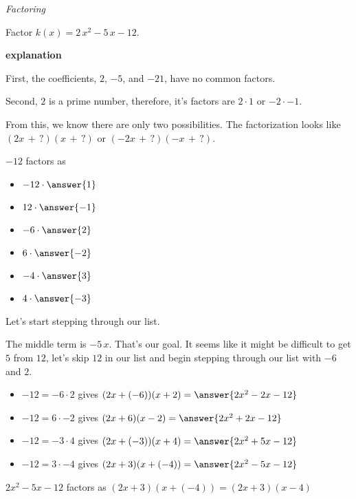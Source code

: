 \documentclass{ximera}
\begin{document}
\begin{example} \textit{Factoring}

Factor $k(x) = 2 \, x^2 - 5 \, x - 12$.


\textbf{explanation}


First, the coefficients, $2$, $-5$, and $-21$, have no common factors.


Second, $2$ is a prime number, therefore, it's factors are $2 \cdot 1$ or $-2 \cdot -1$.

From this, we know there are only two possibilities. The factorization looks like $(2 x \, + \, ?) (x \, + \, ?)$ or $(-2 x \, + \, ?) (-x \, + \, ?)$.






$-12$ factors as 
\begin{itemize}
\item $-12 \cdot \answer{1}$
\item $12 \cdot \answer{-1}$
\item $-6 \cdot \answer{2}$
\item $6 \cdot \answer{-2}$
\item $-4 \cdot \answer{3}$
\item $4 \cdot \answer{-3}$  
\end{itemize}



Let's start stepping through our list.

The middle term is $-5 \, x$.  That's our goal. It seems like it might be difficult to get $5$ from $12$, let's skip $12$ in our list and begin stepping through our list with $-6$ and $2$.

\begin{itemize}

\item $-12 = -6 \cdot 2$ gives $(2 x + (-6)) (x + 2) = \answer{2 x^2 - 2 x - 12}$
\item $-12 = 6 \cdot -2$ gives $(2 x + 6) (x - 2) = \answer{2 x^2 + 2 x -12}$
\item $-12 = -3 \cdot 4$ gives $(2 x + (-3)) (x + 4) = \answer{2 x^2 + 5 x - 12}$
\item $-12 = 3 \cdot -4$ gives $(2 x + 3) (x + (-4)) = \answer{2 x^2 - 5 x -12}$
\end{itemize}

$2 x^2 - 5 x - 12$ factors as $(2 x + 3) (x + (-4)) = (2 x + 3)(x - 4)$



\end{example}
\end{document}
